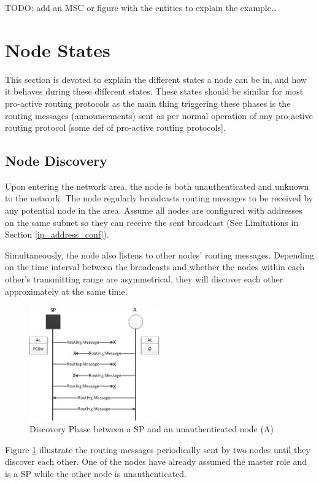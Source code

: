 TODO: add an MSC or figure with the entities to explain the example\ldots

\section{Node States}
This section is devoted to explain the different states a node can be in, and
how it behaves during these different states. These states should be similar for
most pro-active routing protocols as the main thing triggering these phases
is the routing messages (announcements) sent as per normal operation of any
pro-active routing protocol [some def of pro-active routing protocols].

\subsection{Node Discovery}
Upon entering the network area, the node is both unauthenticated and unknown to
the network. The node regularly broadcasts routing messages to be received by
any potential node in the area. Assume all nodes are configured with addresses
on the same subnet so they can receive the sent broadcast (See Limitations in
Section \ref{ip_address_conf}).

Simultaneously, the node also listens to other nodes' routing messages.
Depending on the time interval between the broadcasts and whether the nodes
within each other's transmitting range are asymmetrical, they will discover each
other approximately at the same time.

\begin{figure}[h]
	\centering
  	\includegraphics[width=0.5\textwidth]{images/node_states_discovery.png}
  	\caption{Discovery Phase between a \acf{SP} and an unauthenticated node (A)}
	\label{fig:node_states_discovery}
\end{figure}

Figure \ref{fig:node_states_discovery} illustrate the routing messages
periodically sent by two nodes until they discover each other. One of the nodes
have already assumed the master role and is a \ac{SP} while the other node is
unauthenticated.

